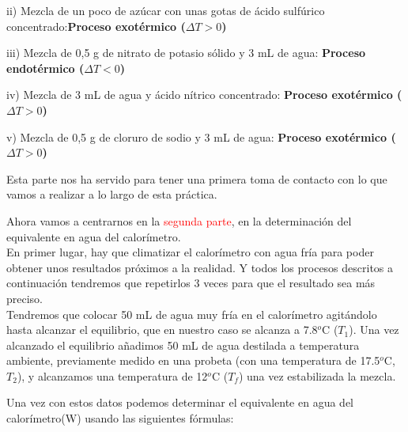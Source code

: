 ii) Mezcla de un poco de azúcar con unas gotas de ácido sulfúrico concentrado:\newline \textbf{Proceso exotérmico ($\Delta{T} > 0$)}

\vspace{0.2cm}

iii) Mezcla de 0,5 g de nitrato de potasio sólido y 3 mL de agua: \newline
\textbf{Proceso endotérmico ($\Delta{T} < 0$)}

\vspace{0.2cm}

iv) Mezcla de 3 mL
de agua y ácido nítrico concentrado: \newline
\textbf{Proceso exotérmico ($\Delta{T} > 0$)}

\vspace{0.2cm}

v) Mezcla de 0,5 g de cloruro
de sodio y 3 mL de agua: \newline
\textbf{Proceso exotérmico ($\Delta{T} > 0$)}

\vspace{0.3cm}
\noindent Esta parte nos ha servido para tener una primera toma de contacto con lo que vamos a realizar a lo largo de esta práctica. \\

\vspace{0.3cm}

\noindent Ahora vamos a centrarnos en la \textcolor{red}{segunda parte}, en la determinación del equivalente en agua del calorímetro. \\

\noindent En primer lugar, hay que climatizar el calorímetro con agua fría para poder obtener unos resultados próximos a la realidad. Y todos los procesos descritos a continuación tendremos que repetirlos 3 veces para que el resultado sea más preciso. \\

\noindent Tendremos que colocar 50 mL de agua muy fría en el calorímetro agitándolo hasta alcanzar el equilibrio, que en nuestro caso se alcanza a 7.8$^o$C ($T_1$). Una vez alcanzado el equilibrio añadimos 50 mL de agua destilada a temperatura ambiente, previamente medido en una probeta (con una temperatura de 17.5$^o$C, $T_2$), y alcanzamos una temperatura de 12$^o$C ($T_f$) una vez estabilizada la mezcla. 

\clearpage

\noindent Una vez con estos datos podemos determinar el equivalente en agua del calorímetro(W) usando las siguientes fórmulas:

